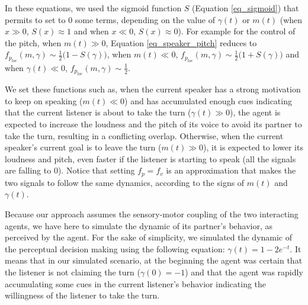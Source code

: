 
In these equations, we used the sigmoid function $S$ (Equation \ref{eq_sigmoid}) that permits to set to $0$ some terms, depending on the value of $\gamma(t)$ or $m(t)$ (when $x \gg 0$, $S(x)\approx 1$ and when $x \ll 0$, $S(x)\approx 0$). 
For example for the control of the pitch, 
when $m(t) \gg 0$, Equation \ref{eq_speaker_pitch} reduces to $f_{p_{loc}}(m,\gamma) \sim \frac{1}{2}\big( 1-S(\gamma) \big)$, 
when $m(t) \ll 0$, $f_{p_{loc}}(m,\gamma) \sim \frac{1}{2}\big( 1 + S(\gamma)\big)$ 
and when $\gamma(t) \ll 0$, $f_{p_{loc}}(m,\gamma) \sim \frac{1}{2}$. 

We set these functions such as, when the current speaker has a strong motivation to keep on speaking ($m(t) \ll 0$) and has accumulated enough cues indicating that the current listener is about to take the turn  ($\gamma(t) \gg 0$), the agent is expected to increase the loudness and the pitch of its voice to avoid its partner to take the turn, resulting in a conflicting overlap. 
Otherwise, when the current speaker's current goal is to leave the turn ($m(t) \gg 0$), it is expected to lower its loudness and pitch, even faster if the listener is starting to speak (all the signals are falling to 0).
Notice that setting $f_p = f_v$ is an approximation that makes the two signals to follow the same dynamics, according to the signs of $m(t)$ and $\gamma(t)$. 

Because our approach assumes the sensory-motor coupling of the two interacting agents, we have here to simulate the dynamic of its partner's behavior, as perceived by the agent.
For the sake of simplicity, we simulated the dynamic of the perceptual decision making using the following equation: $\gamma(t)=1-2e^{-t}$. 
It means that in our simulated scenario, at the beginning the agent was certain that the listener is not claiming the turn ($\gamma(0) = -1$) and that the agent was rapidly accumulating some cues in the current listener's behavior indicating the willingness of the listener to take the turn. 

